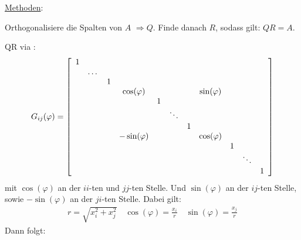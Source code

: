 \vspace{1\baselineskip}

\underline{Methoden}:

\vspace{1\baselineskip}


Orthogonalisiere die Spalten von $A$ $\Rightarrow Q$.
Finde danach $R$, sodass gilt: $QR=A$.

\vspace{1\baselineskip}

QR via :
\footnotesize
\begin{align*}
    G_{ij} (\varphi) = 
    \eckigeklammer{
    \begin{array}{*{11}c}
        1 & & & & & & & & & & \\
        & \dots & & & & & & & & & \\
        & & 1 & & & & & & & & \\
        & & & \cos(\varphi) & & & & \sin(\varphi) & & & \\
        & & & & 1 & & & & & & \\
        & & & & & \ddots & & & & & \\
        & & & & & & 1 & & & & \\
        & & & - \sin(\varphi) & & & & \cos(\varphi) & & & \\ 
        & & & & & & & & 1 & & \\
        & & & & & & & & & \ddots & \\
        & & & & & & & & & & 1
    \end{array} 
    }
\end{align*}
\normalsize
mit $\cos(\varphi)$ an der $ii$-ten und $jj$-ten Stelle. Und $\sin(\varphi)$ an der
$ij$-ten Stelle, sowie $- \sin(\varphi)$ an der $ji$-ten Stelle.
Dabei gilt:
\begin{align*}
    r = \sqrt{x_i^2 + x_j^2}
    \quad
    \cos(\varphi) = \frac{x_i}{r}
    \quad
    \sin(\varphi) = \frac{x_j}{r}
\end{align*}
Dann folgt:

